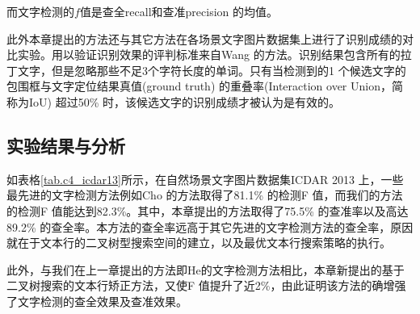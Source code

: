         而文字检测的$f$值是查全recall和查准precision 的均值。

        此外本章提出的方法还与其它方法在各场景文字图片数据集上进行了识别成绩的对比实验。用以验证识别效果的评判标准来自Wang\cite{Wang2012End} 的方法。识别结果包含所有的拉丁文字，但是忽略那些不足3个字符长度的单词。只有当检测到的1 个候选文字的包围框与文字定位结果真值(ground truth) 的重叠率(Interaction over Union，简称为IoU) 超过50\% 时，该候选文字的识别成绩才被认为是有效的。

        \subsection{实验结果与分析}

        如表格\ref{tab.c4_icdar13}所示，在自然场景文字图片数据集ICDAR 2013 上，一些最先进的文字检测方法例如Cho\cite{Cho2016Canny} 的方法取得了81.1\% 的检测F 值，而我们的方法的检测F 值能达到82.3\%。其中，本章提出的方法取得了75.5\% 的查准率以及高达89.2\% 的查全率。本方法的查全率远高于其它先进的文字检测方法的查全率，原因就在于文本行的二叉树型搜索空间的建立，以及最优文本行搜索策略的执行。


        此外，与我们在上一章提出的方法即He\cite{He2017scene}的文字检测方法相比，本章新提出的基于二叉树搜索的文本行矫正方法，又使F 值提升了近2\%，由此证明该方法的确增强了文字检测的查全效果及查准效果。

